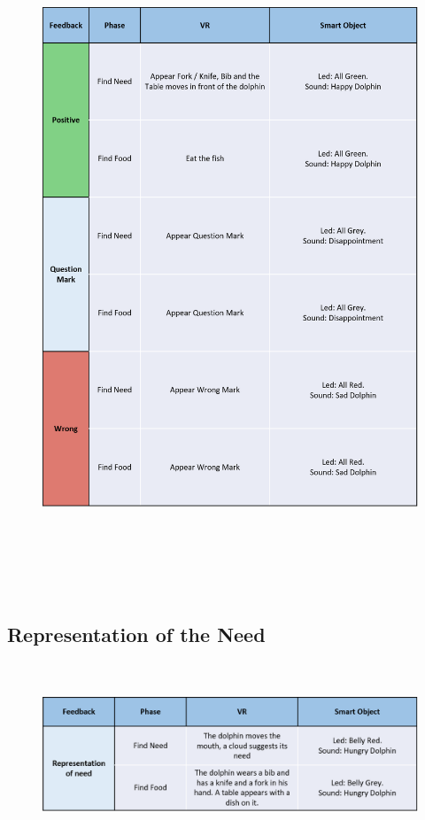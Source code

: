 \documentclass [12pt]{article}
\begin{document}
\begin{figure}[ht!]
\centering
\includegraphics[height=20cm,width=15cm]{FeedbackUX1.png}
\end{figure}

\clearpage

\subsection{Representation of the Need}


\begin{figure}[ht!]
\centering
\includegraphics[height=5.5cm,width=14cm]{FeedbackUX2.png}
\end{figure}
\end{document}
